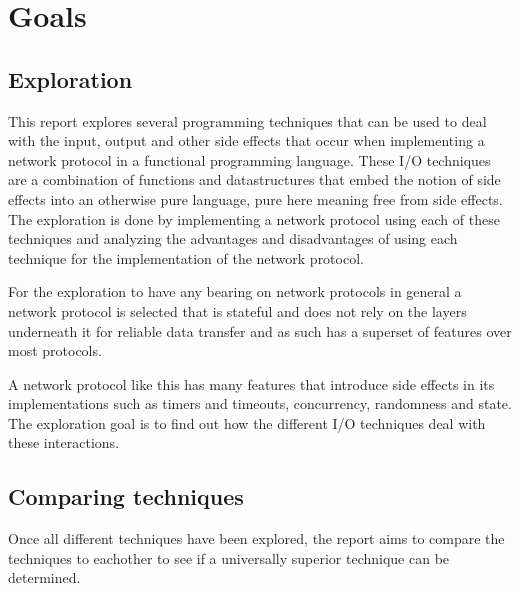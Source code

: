 \chapter{Goals}
\section{Exploration}
This report explores several programming techniques that can be used to deal with the input, output and other side effects that occur when implementing a network protocol in a functional programming language.
These I/O techniques are a combination of functions and datastructures that embed the notion of side effects into an otherwise pure language, pure here meaning free from side effects.
The exploration is done by implementing a network protocol using each of these techniques and analyzing the advantages and disadvantages of using each technique for the implementation of the network protocol.

For the exploration to have any bearing on network protocols in general a network protocol is selected that is stateful and does not rely on the layers underneath it for reliable data transfer and as such has a superset of features over most protocols. 

A network protocol like this has many features that introduce side effects in its implementations such as timers and timeouts, concurrency, randomness and state.
The exploration goal is to find out how the different I/O techniques deal with these interactions.

\section{Comparing techniques}
Once all different techniques have been explored, the report aims to compare the techniques to eachother to see if a universally superior technique can be determined.

